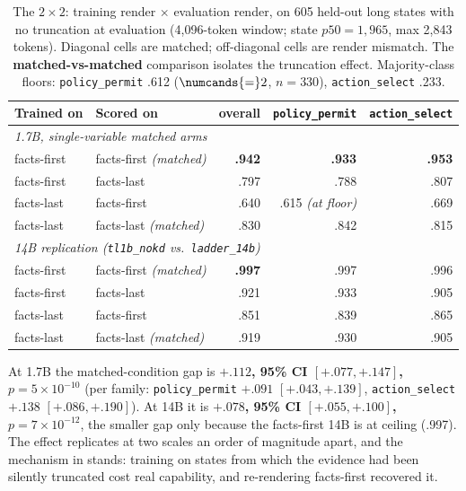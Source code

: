 \begin{table}[t]
  \centering
  \caption{The $2\times2$: training render $\times$ evaluation render, on 605 held-out long states with
  no truncation at evaluation (4{,}096-token window; state $p50 = 1{,}965$, max 2{,}843 tokens).
  Diagonal cells are matched; off-diagonal cells are render mismatch. The \textbf{matched-vs-matched}
  comparison isolates the truncation effect. Majority-class floors: \texttt{policy\_permit} .612
  ($\numcands{=}2$, $n{=}330$), \texttt{action\_select} .233.}
  \label{tab:twobytwo}
  \small
  \setlength{\tabcolsep}{5pt}
  \begin{tabular}{llrrr}
    \toprule
    Trained on & Scored on & overall & \texttt{policy\_permit} & \texttt{action\_select} \\
    \midrule
    \multicolumn{5}{l}{\emph{1.7B, single-variable matched arms}} \\
    facts-first & facts-first \emph{(matched)} & \textbf{.942} & \textbf{.933} & \textbf{.953} \\
    facts-first & facts-last & .797 & .788 & .807 \\
    facts-last & facts-first & .640 & .615 \emph{(at floor)} & .669 \\
    facts-last & facts-last \emph{(matched)} & .830 & .842 & .815 \\
    \midrule
    \multicolumn{5}{l}{\emph{14B replication (\texttt{tl1b\_nokd} vs.\ \texttt{ladder\_14b})}} \\
    facts-first & facts-first \emph{(matched)} & \textbf{.997} & .997 & .996 \\
    facts-first & facts-last & .921 & .933 & .905 \\
    facts-last & facts-first & .851 & .839 & .865 \\
    facts-last & facts-last \emph{(matched)} & .919 & .930 & .905 \\
    \bottomrule
  \end{tabular}
\end{table}

At 1.7B the matched-condition gap is \textbf{$+.112$, 95\% CI $[+.077, +.147]$, $p = 5\times10^{-10}$}
(per family: \texttt{policy\_permit} $+.091$ $[+.043, +.139]$, \texttt{action\_select} $+.138$
$[+.086, +.190]$). At 14B it is \textbf{$+.078$, 95\% CI $[+.055, +.100]$, $p = 7\times10^{-12}$}, the
smaller gap only because the facts-first 14B is at ceiling (.997). The effect replicates at two scales an
order of magnitude apart, and the mechanism in  stands: training on states from
which the evidence had been silently truncated cost real capability, and re-rendering facts-first
recovered it.

